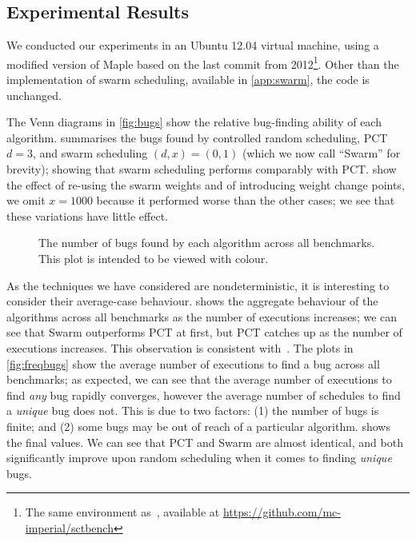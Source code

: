 \subsection{Experimental Results}
\label{sec:algorithms-eval-results}

We conducted our experiments in an Ubuntu 12.04 virtual machine, using a
modified version of Maple based on the last commit from 2012\footnote{The same
environment as~\cite{thomson2016}, available
at \url{https://github.com/mc-imperial/sctbench}}.  Other than the
implementation of swarm scheduling, available in \cref{app:swarm}, the code is
unchanged.

The Venn diagrams in \cref{fig:bugs} show the relative bug-finding ability of
each algorithm.   summarises the bugs found by controlled
random scheduling, PCT $d=3$, and swarm scheduling $(d,x)=(0,1)$ (which we now
call ``Swarm'' for brevity); showing that swarm scheduling performs comparably
with PCT.   show the effect of re-using
the swarm weights and of introducing weight change points, we omit $x=1000$
because it performed worse than the other cases; we see that these variations
have little effect.

\begin{figure}
  \centering
  
  \caption[Plot of bugs found by each scheduling algorithm.]{The number of bugs found by each algorithm across all benchmarks.  This plot is intended to be viewed with colour.}\label{fig:totalbugs}
\end{figure}

As the techniques we have considered are nondeterministic, it is interesting to
consider their average-case behaviour.   shows the aggregate
behaviour of the algorithms across all benchmarks as the number of executions
increases; we can see that Swarm outperforms PCT at first, but PCT catches up
as the number of executions increases.  This observation is consistent
with~\cite{thomson2016}.  The plots in \cref{fig:freqbugs} show the average number
of executions to find a bug across all benchmarks; as expected, we can see that
the average number of executions to find \emph{any} bug rapidly converges,
however the average number of schedules to find a \emph{unique} bug does not.
This is due to two factors: (1) the number of bugs is finite; and (2) some bugs
may be out of reach of a particular algorithm.   shows the final
values.  We can see that PCT and Swarm are almost identical, and both
significantly improve upon random scheduling when it comes to
finding \emph{unique} bugs.

